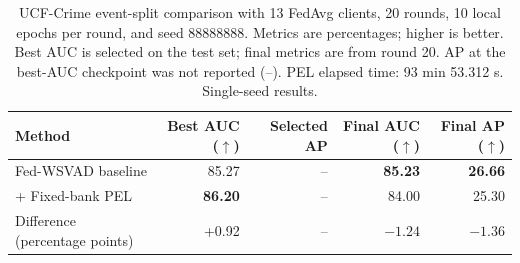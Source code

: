 \begin{table}[t]
  \centering
  \caption{UCF-Crime event-split comparison with 13 FedAvg clients, 20 rounds, 10 local epochs per round, and seed 88888888. Metrics are percentages; higher is better. Best AUC is selected on the test set; final metrics are from round 20. AP at the best-AUC checkpoint was not reported (--). PEL elapsed time: 93 min 53.312 s. Single-seed results.}
  \label{tab:ucf-event-fixed-bank-pel-seed88888888}
  \small
  \setlength{\tabcolsep}{4pt}
  \begin{tabular}{lrrrr}
    \toprule
    Method & Best AUC ($\uparrow$) & Selected AP & Final AUC ($\uparrow$) & Final AP ($\uparrow$) \\
    \midrule
    Fed-WSVAD baseline & 85.27 & -- & \textbf{85.23} & \textbf{26.66} \\
    + Fixed-bank PEL & \textbf{86.20} & -- & 84.00 & 25.30 \\
    \midrule
    Difference (percentage points) & +0.92 & -- & $-1.24$ & $-1.36$ \\
    \bottomrule
  \end{tabular}
\end{table}
